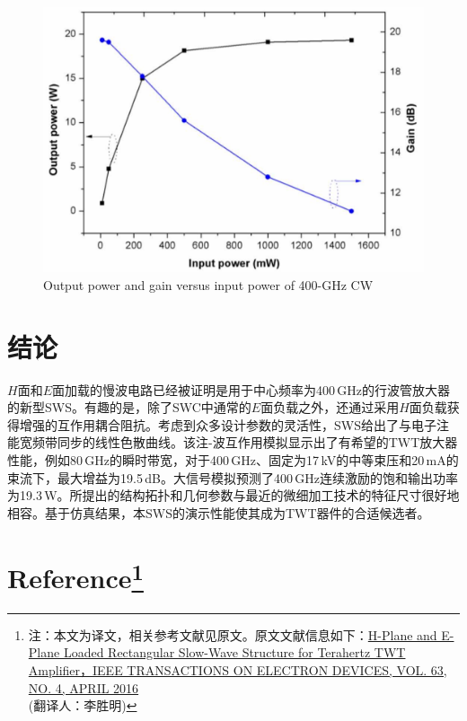 \documentclass[10pt,a4paper,UTF8]{ctexart}
\begin{document}
\begin{figure}[H]
	\centering
	\includegraphics[width=0.95\linewidth]{figure/fig12}
	\caption{Output power and gain versus input power of 400-GHz CW}
	\label{fig12}
\end{figure}

\newpage
\section{结论} \label{sec:5}
$H$面和$E$面加载的慢波电路已经被证明是用于中心频率为400\,GHz的行波管放大器的新型SWS。有趣的是，除了SWC中通常的$E$面负载之外，还通过采用$H$面负载获得增强的互作用耦合阻抗。考虑到众多设计参数的灵活性，SWS给出了与电子注能宽频带同步的线性色散曲线。该注-波互作用模拟显示出了有希望的TWT放大器性能，例如80\,GHz的瞬时带宽，对于400\,GHz、固定为17\,kV的中等束压和20\,mA的束流下，最大增益为19.5\,dB。大信号模拟预测了400\,GHz连续激励的饱和输出功率为19.3\,W。所提出的结构拓扑和几何参数与最近的微细加工技术的特征尺寸很好地相容。基于仿真结果，本SWS的演示性能使其成为TWT器件的合适候选者。%

\section*{Reference\footnote{注：本文为译文，相关参考文献见原文。原文文献信息如下：\href{http://ieeexplore.ieee.org/document/7426768/}{H-Plane and E-Plane Loaded Rectangular
			Slow-Wave Structure for Terahertz TWT Amplifier，IEEE TRANSACTIONS ON ELECTRON DEVICES, VOL. 63, NO. 4, APRIL 2016}\\(翻译人：李胜明)}}
\end{document}
